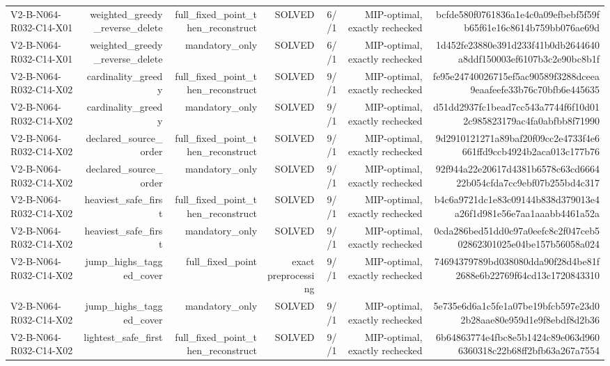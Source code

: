 {\begin{longtable}{lrrrrrr}
V2-B-N064-R032-C14-X01 & weighted\_greedy\_reverse\_delete & full\_fixed\_point\_then\_reconstruct & SOLVED & 6//1 & MIP-optimal, exactly rechecked & bcfde580f0761836a1e4c0a09efbebf5f59fb65f61e16c8614b759bb076ae69d \\
V2-B-N064-R032-C14-X01 & weighted\_greedy\_reverse\_delete & mandatory\_only & SOLVED & 6//1 & MIP-optimal, exactly rechecked & 1d452fe23880e391d233f41b0db2644640a8ddf150003ef6107b3c2e90bc8b1f \\
V2-B-N064-R032-C14-X02 & cardinality\_greedy & full\_fixed\_point\_then\_reconstruct & SOLVED & 9//1 & MIP-optimal, exactly rechecked & fe95e24740026715ef5ac90589f3288dceea9eaafeefe33b76c70bfb6e445635 \\
V2-B-N064-R032-C14-X02 & cardinality\_greedy & mandatory\_only & SOLVED & 9//1 & MIP-optimal, exactly rechecked & d51dd2937fc1bead7cc543a7744f6f10d012c985823179ac4fa0abfbb8f71990 \\
V2-B-N064-R032-C14-X02 & declared\_source\_order & full\_fixed\_point\_then\_reconstruct & SOLVED & 9//1 & MIP-optimal, exactly rechecked & 9d2910121271a89baf20f09cc2e4733f4e6661ffd9ccb4924b2aca013c177b76 \\
V2-B-N064-R032-C14-X02 & declared\_source\_order & mandatory\_only & SOLVED & 9//1 & MIP-optimal, exactly rechecked & 92f944a22e20617d4381b6578c63cd666422b054cfda7cc9ebf07b255bd4c317 \\
V2-B-N064-R032-C14-X02 & heaviest\_safe\_first & full\_fixed\_point\_then\_reconstruct & SOLVED & 9//1 & MIP-optimal, exactly rechecked & b4c6a9721dc1e83c09144b838d379013e4a26f1d981e56e7aa1aaabb4461a52a \\
V2-B-N064-R032-C14-X02 & heaviest\_safe\_first & mandatory\_only & SOLVED & 9//1 & MIP-optimal, exactly rechecked & 0cda286bed51dd0c97a0eefc8c2f047ceb502862301025e04be157b56058a024 \\
V2-B-N064-R032-C14-X02 & jump\_highs\_tagged\_cover & full\_fixed\_point & exact preprocessing & 9//1 & MIP-optimal, exactly rechecked & 74694379789bd038080dda90f28d4be81f2688e6b22769f64cd13c1720843310 \\
V2-B-N064-R032-C14-X02 & jump\_highs\_tagged\_cover & mandatory\_only & SOLVED & 9//1 & MIP-optimal, exactly rechecked & 5e735e6d6a1c5fe1a07be19bfcb597e23d02b28aae80e959d1e9f8ebdf8d2b36 \\
V2-B-N064-R032-C14-X02 & lightest\_safe\_first & full\_fixed\_point\_then\_reconstruct & SOLVED & 9//1 & MIP-optimal, exactly rechecked & 6b64863774e4fbc8e5b1424c89e063d9606360318c22b68ff2bfb63a267a7554 \\

\end{longtable}}
